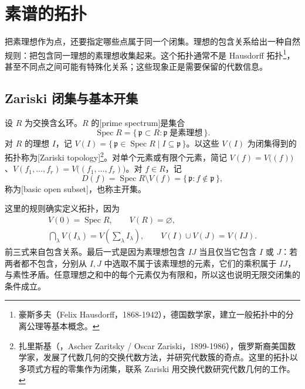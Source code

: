 
\section{素谱的拓扑}
\label{b3:sec:0103}

把素理想作为点，还要指定哪些点属于同一个闭集。理想的包含关系给出一种自然规则：把包含同一理想的素理想收集起来。这个拓扑通常不是 Hausdorff 拓扑\footnote{豪斯多夫（Felix Hausdorff，1868-1942），德国数学家，建立一般拓扑中的分离公理等基本概念。}，甚至不同点之间可能有特殊化关系；这些现象正是需要保留的代数信息。

\subsection{Zariski 闭集与基本开集}
\label{b3:subsec:0103:01}

\begin{definition}\label{b3:def:spectrum-zariski}
	设 \(R\) 为交换含幺环。\(R\) 的[prime spectrum]是集合
	\[
		\operatorname{Spec}R=\{\,\mathfrak p\subset R:\mathfrak p\;\text{是素理想}\,\}.
	\]
	对 \(R\) 的理想 \(I\)，记 \(V(I)=\{\,\mathfrak p\in\operatorname{Spec}R\mid I\subseteq\mathfrak p\,\}\)。以这些 \(V(I)\) 为闭集得到的拓扑称为[Zariski topology]\footnote{扎里斯基（，Ascher Zaritsky / Oscar Zariski，1899-1986），俄罗斯裔美国数学家，发展了代数几何的交换代数方法，并研究代数簇的奇点。这里的拓扑以多项式方程的零集作为闭集，联系 Zariski 用交换代数研究代数几何的工作。}。对单个元素或有限个元素，简记 \(V(f)=V\bigl((f)\bigr)\)、\(V(f_1,\ldots,f_r)=V\bigl((f_1,\ldots,f_r)\bigr)\)。对 \(f\in R\)，记
	\[
		D(f)=\operatorname{Spec}R\setminus V(f) =\{\,\mathfrak p:f\notin\mathfrak p\,\},
	\]
	称为[basic open subset]，也称主开集。
\end{definition}

这里的规则确实定义拓扑，因为
\begin{equation}\label{b3:eq:zariski-closed-identities}
	\begin{gathered}
		V(0)=\operatorname{Spec}R,\qquad V(R)=\varnothing,
		\\
		\bigcap_\lambda V(I_\lambda)=V\left(\sum_\lambda I_\lambda\right), \qquad V(I)\cup V(J)=V(IJ).
	\end{gathered}
\end{equation}
前三式来自包含关系。最后一式是因为素理想包含 \(IJ\) 当且仅当它包含 \(I\) 或 \(J\)：若两者都不包含，分别从 \(I,J\) 中选取不属于该素理想的元素，它们的乘积属于 \(IJ\)，与素性矛盾。任意理想之和中的每个元素仅为有限和，所以这也说明无限交闭集的条件成立。

